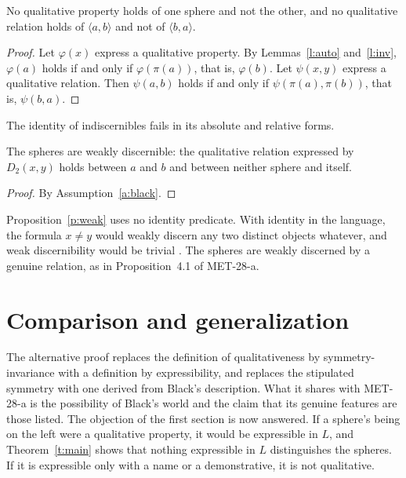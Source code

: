 \documentclass{situationist-preprint}
\begin{document}
\begin{theorem}\label{t:main}
No qualitative property holds of one sphere and not the other, and no qualitative relation holds of $\langle a, b\rangle$ and not of $\langle b, a\rangle$.
\end{theorem}

\begin{proof}
Let $\varphi(x)$ express a qualitative property. By Lemmas~\ref{l:auto} and~\ref{l:inv}, $\varphi(a)$ holds if and only if $\varphi(\pi(a))$, that is, $\varphi(b)$. Let $\psi(x,y)$ express a qualitative relation. Then $\psi(a,b)$ holds if and only if $\psi(\pi(a),\pi(b))$, that is, $\psi(b,a)$.
\end{proof}

\begin{corollary}\label{c:pii}
The identity of indiscernibles fails in its absolute and relative forms.
\end{corollary}

\begin{proposition}\label{p:weak}
The spheres are weakly discernible: the qualitative relation expressed by $D_2(x,y)$ holds between $a$ and $b$ and between neither sphere and itself.
\end{proposition}

\begin{proof}
By Assumption~\ref{a:black}.
\end{proof}

Proposition~\ref{p:weak} uses no identity predicate. With identity in the language, the formula $x \neq y$ would weakly discern any two distinct objects whatever, and weak discernibility would be trivial \citep{LadymanLinneboPettigrew2012}. The spheres are weakly discerned by a genuine relation, as in Proposition~4.1 of MET-28-a.

\section{Comparison and generalization}

The alternative proof replaces the definition of qualitativeness by symmetry-invariance with a definition by expressibility, and replaces the stipulated symmetry with one derived from Black's description. What it shares with MET-28-a is the possibility of Black's world and the claim that its genuine features are those listed. The objection of the first section is now answered. If a sphere's being on the left were a qualitative property, it would be expressible in $L$, and Theorem~\ref{t:main} shows that nothing expressible in $L$ distinguishes the spheres. If it is expressible only with a name or a demonstrative, it is not qualitative.
\end{document}
